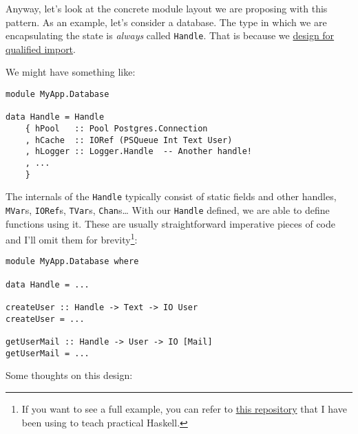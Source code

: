 Anyway, let's look at the concrete module layout we are proposing with
this pattern. As an example, let's consider a database. The type in
which we are encapsulating the state is \emph{always} called
\texttt{Handle}. That is because we
\href{https://mail.haskell.org/pipermail/haskell-cafe/2008-June/043986.html}{design
for qualified import}.

We might have something like:

\begin{verbatim}
module MyApp.Database

data Handle = Handle
    { hPool   :: Pool Postgres.Connection
    , hCache  :: IORef (PSQueue Int Text User)
    , hLogger :: Logger.Handle  -- Another handle!
    , ...
    }
\end{verbatim}
The internals of the \texttt{Handle} typically consist of static fields
and other handles, \texttt{MVar}s, \texttt{IORef}s, \texttt{TVar}s,
\texttt{Chan}s\ldots{} With our \texttt{Handle} defined, we are able to
define functions using it. These are usually straightforward imperative
pieces of code and I'll omit them for
brevity\footnote{If you want to see a full example, you can refer to
  \href{https://github.com/jaspervdj/fugacious}{this repository} that I
  have been using to teach practical
  Haskell.}:

\begin{verbatim}
module MyApp.Database where

data Handle = ...

createUser :: Handle -> Text -> IO User
createUser = ...

getUserMail :: Handle -> User -> IO [Mail]
getUserMail = ...
\end{verbatim}
Some thoughts on this design:

